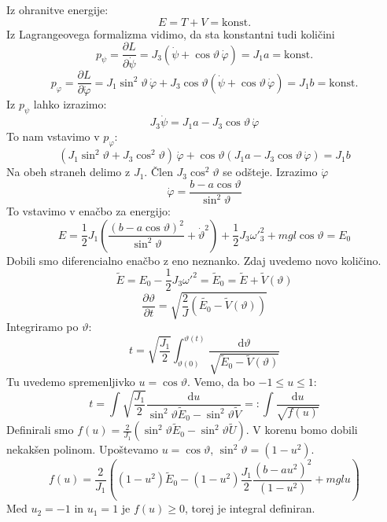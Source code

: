 \documentclass[a4paper]{article}
\newcommand{\dif}{\mathrm{d}}
\newcommand{\pd}[2]{\frac{\partial {#1}}{\partial {#2}}}
\begin{document}
Iz ohranitve energije:
$$E = T + V = \text{konst.}$$
Iz Lagrangeovega formalizma vidimo, da sta konstantni tudi količini
$$p_\psi = \pd{L}{\dot\psi} = J_3\left(\dot\psi + \cos\vartheta\,\dot\varphi\right) = J_1 a = \text{konst.}$$
$$p_\varphi = \pd{L}{\dot\varphi} = J_1\sin^2\vartheta\,\dot\varphi + J_3\cos\vartheta\left(\dot\psi + \cos\vartheta\,\dot\varphi\right) = J_1b = \text{konst.}$$
Iz $p_\psi$ lahko izrazimo:
$$J_3\dot\psi = J_1 a - J_3\cos\vartheta\,\dot\varphi$$
To nam vstavimo v $p_\varphi$:
$$(J_1\sin^2\vartheta + J_3\cos^2\vartheta)\,\dot\varphi + \cos\vartheta(J_1 a - J_3\cos\vartheta\,\dot\varphi) = J_1 b$$
Na obeh straneh delimo z $J_1$. Člen $J_3\cos^2\vartheta$ se odšteje. Izrazimo $\dot\varphi$
$$\dot\varphi = \frac{b-a\cos\vartheta}{\sin^2\vartheta}$$
To vstavimo v enačbo za energijo:
$$E = \frac{1}{2}J_1\left(\frac{(b - a\cos\vartheta)^2}{\sin^2\vartheta} + \dot\vartheta^2\right) + \frac{1}{2}J_3{\omega'}_3^2 + mgl\cos\vartheta = E_0$$
Dobili smo diferencialno enačbo z eno neznanko. Zdaj uvedemo novo količino.
$$\tilde{E} = E_0 - \frac{1}{2}J_3{\omega'}^2 = \tilde{E}_0 = \tilde{E} + \tilde{V}(\vartheta)$$
$$\pd{\vartheta}{t} = \sqrt{\frac{2}{J}\left(\tilde{E_0}-\tilde{V}(\vartheta)\right)}$$
Integriramo po $\vartheta$:
$$t = \sqrt{\frac{J_1}{2}} \int_{\vartheta(0)}^{\vartheta(t)}\frac{\dif\vartheta}{\sqrt{\tilde{E}_0 - \tilde{V}(\vartheta)}}$$
Tu uvedemo spremenljivko $u = \cos\vartheta$. Vemo, da bo $-1 \leq u \leq 1$:
$$t = \int \sqrt{\frac{J_1}{2}} \frac{\dif u}{\sin^2\vartheta \tilde{E}_0 - \sin^2\vartheta\tilde{V}} =: \int \frac{\dif u}{\sqrt{f(u)}}$$
Definirali smo $\displaystyle{f(u) = \frac{2}{J_1}\left(\sin^2\vartheta\tilde{E}_0 - \sin^2\vartheta\tilde{U}\right)}$. V korenu bomo dobili nekakšen polinom.
Upoštevamo $u = \cos\vartheta$, $\sin^2\vartheta = (1 - u^2)$.
$$f(u) = \frac{2}{J_1}\left((1-u^2)\tilde{E}_0 - (1-u^2)\frac{J_1}{2}\frac{(b-au^2)^2}{(1-u^2)} + mglu\right)$$
Med $u_2=-1$ in $u_1 = 1$ je $f(u) \geq 0$, torej je integral definiran.
\end{document}
